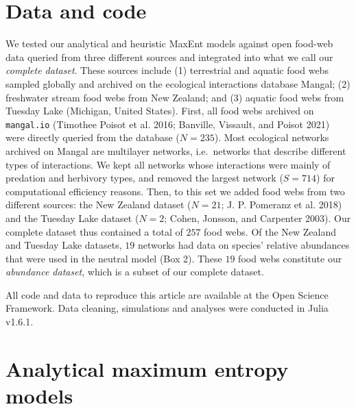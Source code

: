 \documentclass[11pt]{article}
\begin{document}
\hypertarget{data-and-code}{%
\section{Data and code}\label{data-and-code}}

We tested our analytical and heuristic MaxEnt models against open
food-web data queried from three different sources and integrated into
what we call our \emph{complete dataset}. These sources include (1)
terrestrial and aquatic food webs sampled globally and archived on the
ecological interactions database Mangal; (2) freshwater stream food webs
from New Zealand; and (3) aquatic food webs from Tuesday Lake (Michigan,
United States). First, all food webs archived on \texttt{mangal.io}
(Timothee Poisot et al. 2016; Banville, Vissault, and Poisot 2021) were
directly queried from the database (\(N = 235\)). Most ecological
networks archived on Mangal are multilayer networks, i.e.~networks that
describe different types of interactions. We kept all networks whose
interactions were mainly of predation and herbivory types, and removed
the largest network (\(S = 714\)) for computational efficiency reasons.
Then, to this set we added food webs from two different sources: the New
Zealand dataset (\(N = 21\); J. P. Pomeranz et al. 2018) and the Tuesday
Lake dataset (\(N = 2\); Cohen, Jonsson, and Carpenter 2003). Our
complete dataset thus contained a total of \(257\) food webs. Of the New
Zealand and Tuesday Lake datasets, \(19\) networks had data on species'
relative abundances that were used in the neutral model (Box 2). These
\(19\) food webs constitute our \emph{abundance dataset}, which is a
subset of our complete dataset.

All code and data to reproduce this article are available at the Open
Science Framework. Data cleaning, simulations and analyses were
conducted in Julia v1.6.1.

\hypertarget{analytical-maximum-entropy-models}{%
\section{Analytical maximum entropy
models}\label{analytical-maximum-entropy-models}}
\end{document}
